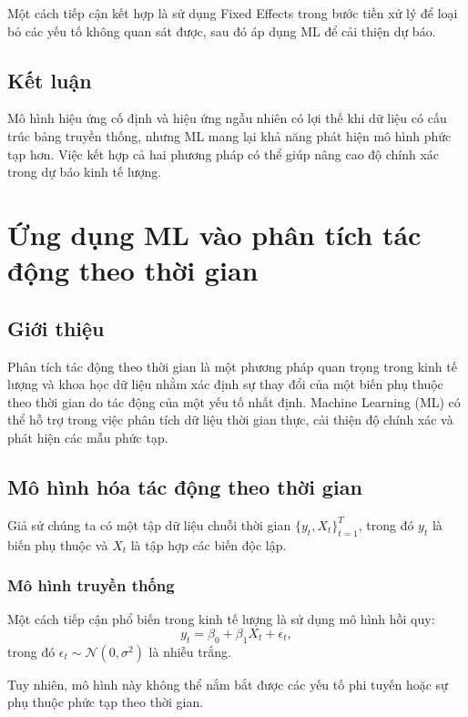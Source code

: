 Một cách tiếp cận kết hợp là sử dụng Fixed Effects trong bước tiền xử lý để loại bỏ các yếu tố không quan sát được, sau đó áp dụng ML để cải thiện dự báo.

\subsection{Kết luận}
Mô hình hiệu ứng cố định và hiệu ứng ngẫu nhiên có lợi thế khi dữ liệu có cấu trúc bảng truyền thống, nhưng ML mang lại khả năng phát hiện mô hình phức tạp hơn. Việc kết hợp cả hai phương pháp có thể giúp nâng cao độ chính xác trong dự báo kinh tế lượng.





\section{Ứng dụng ML vào phân tích tác động theo thời gian}
\subsection{Giới thiệu}
Phân tích tác động theo thời gian là một phương pháp quan trọng trong kinh tế lượng và khoa học dữ liệu nhằm xác định sự thay đổi của một biến phụ thuộc theo thời gian do tác động của một yếu tố nhất định. Machine Learning (ML) có thể hỗ trợ trong việc phân tích dữ liệu thời gian thực, cải thiện độ chính xác và phát hiện các mẫu phức tạp.

\subsection{Mô hình hóa tác động theo thời gian}
Giả sử chúng ta có một tập dữ liệu chuỗi thời gian $\{y_t, X_t\}_{t=1}^{T}$, trong đó $y_t$ là biến phụ thuộc và $X_t$ là tập hợp các biến độc lập.

\subsubsection{Mô hình truyền thống}
Một cách tiếp cận phổ biến trong kinh tế lượng là sử dụng mô hình hồi quy:
\begin{equation}
    y_t = \beta_0 + \beta_1 X_t + \epsilon_t,
\end{equation}
trong đó $\epsilon_t \sim \mathcal{N}(0, \sigma^2)$ là nhiễu trắng.

Tuy nhiên, mô hình này không thể nắm bắt được các yếu tố phi tuyến hoặc sự phụ thuộc phức tạp theo thời gian.

